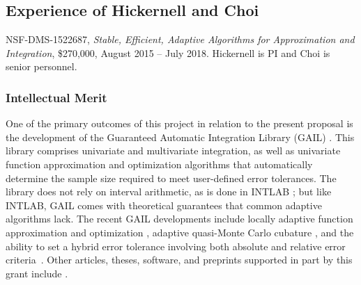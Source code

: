 \documentclass[11pt]{NSFamsart}
\begin{document}
\subsection{Experience of Hickernell and Choi}
NSF-DMS-1522687, \emph{Stable, Efficient, Adaptive Algorithms for Approximation and 
Integration}, \$270,000, August 2015 -- July 2018. \label{SectHickernellPrevious}  Hickernell is PI and Choi is senior personnel.  

\subsubsection{Intellectual Merit}
One of the primary outcomes of this project in relation to the present proposal is the development of the \hypertarget{GAILlink}{Guaranteed Automatic Integration Library (GAIL)} \cite{ChoEtal17b}.  This library comprises univariate and multivariate integration, as well as univariate function approximation and optimization algorithms that automatically determine the sample size required to meet user-defined error tolerances.  The library does not rely on interval arithmetic, as is done in INTLAB \cite{MoKeCl09, Rum99a, Rum10a}; but like INTLAB, GAIL comes with theoretical guarantees that common adaptive algorithms lack. The recent GAIL developments include locally adaptive function approximation and optimization \cite{ChoEtal17a, Din15a}, adaptive quasi-Monte Carlo cubature \cite{HicJim16a, JimHic16a}, and the ability to set a hybrid error tolerance involving both absolute and relative error criteria~\cite{HicEtal17a}.  Other articles, theses,  software, and preprints supported in part by this grant include 
\cite{ala_augmented_2017, 
	GilEtal16a,
	GilJim16b,
	HicEtal18a,	
	Hic17a,
	JohFasHic18a,
	Li16a,
	Liu17a,
	mccourt_stable_2017,
	mishra_hybrid_nodate,
	mishra_stable_nodate, 
	rashidinia_stable_nodate,
	vu_rbf-fd_nodate,
	Zha17a,
	Zho15a,
	ZhoHic15a}.
    
\end{document}

